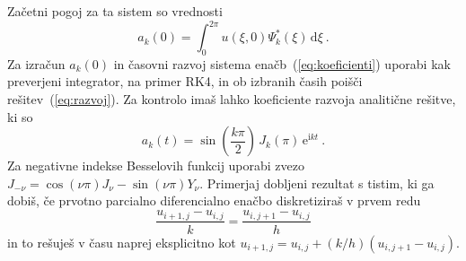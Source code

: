 \documentclass[slovene,11pt,a4paper]{article}
\newcommand{\dd}{\,\mathrm{d}}
\begin{document}
Začetni pogoj za ta sistem so vrednosti
\begin{equation*}
  a_k(0) = \int_0^{2\pi} u(\xi,0) \Psi^*_k(\xi) \dd \xi \>.
\end{equation*}
Za izračun $a_k(0)$ in časovni razvoj sistema enačb~(\ref{eq:koeficienti})
uporabi kak preverjeni integrator, na primer RK4, in ob
izbranih časih poišči rešitev~(\ref{eq:razvoj}).  Za kontrolo imaš
lahko koeficiente razvoja analitične rešitve, ki so
\begin{equation*}
  a_k(t)=\sin\left(\frac{k\pi}{ 2}\right)\,J_k(\pi)\,\mathrm{e}^{\mathrm{i}kt} \>.
\end{equation*}
Za negativne indekse Besselovih funkcij uporabi zvezo
$J_{-\nu} = \cos(\nu\pi) J_\nu - \sin(\nu\pi) Y_\nu$.
Primerjaj dobljeni rezultat s tistim, ki ga dobiš,
če prvotno parcialno diferencialno enačbo diskretiziraš
v prvem redu
\begin{equation*}
\frac{u_{i+1,j} - u_{i,j}}{ k} = \frac{u_{i,j+1} - u_{i,j}}{ h}
\end{equation*}
in to rešuješ v času naprej eksplicitno kot
$u_{i+1,j} = u_{i,j} + (k/h)(u_{i,j+1} - u_{i,j})$.
\end{document}
